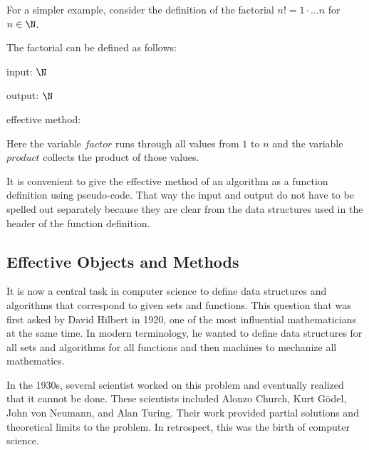 For a simpler example, consider the definition of the factorial $n!=1\cdot \ldots n$ for $n\in\N$.

\begin{example}[Factorial]\label{ex:ad:factorial}
The factorial can be defined as follows:
\begin{compactitem}
\item input: $\N$
\item output: $\N$
\item effective method:
\begin{acode}
\end{acode}

Here the variable $factor$ runs through all values from $1$ to $n$ and the variable $product$ collects the product of those values.
\end{compactitem}
\end{example}

\begin{notation}
It is convenient to give the effective method of an algorithm as a function definition using pseudo-code.
That way the input and output do not have to be spelled out separately because they are clear from the data structures used in the header of the function definition.
\end{notation}

\subsection{Effective Objects and Methods}\label{sec:ad:effective}

It is now a central task in computer science to define data structures and algorithms that correspond to given sets and functions.
This question that was first asked by David Hilbert in 1920, one of the most influential mathematicians at the same time.
In modern terminology, he wanted to define data structures for all sets and algorithms for all functions and then machines to mechanize all mathematics.

In the 1930s, several scientist worked on this problem and eventually realized that it cannot be done.
These scientists included Alonzo Church, Kurt G\"odel, John von Neumann, and Alan Turing.
Their work provided partial solutions and theoretical limits to the problem.
In retrospect, this was the birth of computer science.

